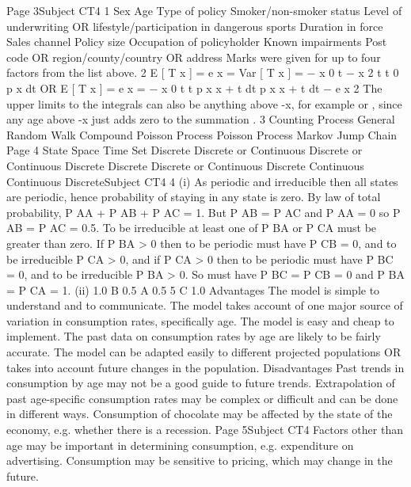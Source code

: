 Page 3Subject CT4 %
1
Sex
Age
Type of policy
Smoker/non-smoker status
Level of underwriting OR lifestyle/participation in dangerous sports
Duration in force
Sales channel
Policy size
Occupation of policyholder
Known impairments
Post code OR region/county/country OR address
Marks were given for up to four factors from the list above.
2
E [ T x ] = e x = \int
Var [ T x ] =
{ \int
\omega− x
0
t
\omega− x 2
t t
0
p x dt
OR
E [ T x ] = e x = \int
\omega− x
0
t t p x \mu x + t dt
}
p x \mu x + t dt − e x 2
The upper limits to the integrals can also be anything above \omega-x, for example \omega or \infty, since
any age above \omega-x just adds zero to the summation .
3
Counting Process
General Random Walk
Compound Poisson Process
Poisson Process
Markov Jump Chain
Page 4
State Space Time Set
Discrete
Discrete or Continuous
Discrete or Continuous
Discrete
Discrete Discrete or Continuous
Discrete
Continuous
Continuous
DiscreteSubject CT4 %
4
(i)
As periodic and irreducible then all states are periodic, hence
probability of staying in any state is zero.
By law of total probability, P AA + P AB + P AC = 1.
But P AB = P AC and P AA = 0 so P AB = P AC = 0.5.
To be irreducible at least one of P BA or P CA must be greater than zero.
If P BA > 0 then to be periodic must have P CB = 0,
and to be irreducible P CA > 0,
and if P CA > 0 then to be periodic must have P BC = 0, and to be
irreducible P BA > 0.
So must have P BC = P CB = 0 and P BA = P CA = 1.
(ii)
1.0
B
0.5
A
0.5
5
C
1.0
Advantages
The model is simple to understand and to communicate.
The model takes account of one major source of variation in consumption
rates, specifically age.
The model is easy and cheap to implement.
The past data on consumption rates by age are likely to be fairly accurate.
The model can be adapted easily to different projected populations OR takes
into account future changes in the population.
Disadvantages
Past trends in consumption by age may not be a good guide to future trends.
Extrapolation of past age-specific consumption rates may be complex or
difficult and can be done in different ways.
Consumption of chocolate may be affected by the state of the economy,
e.g. whether there is a recession.
Page 5Subject CT4 %
Factors other than age may be important in determining consumption,
e.g. expenditure on advertising.
Consumption may be sensitive to pricing, which may change in the future.
